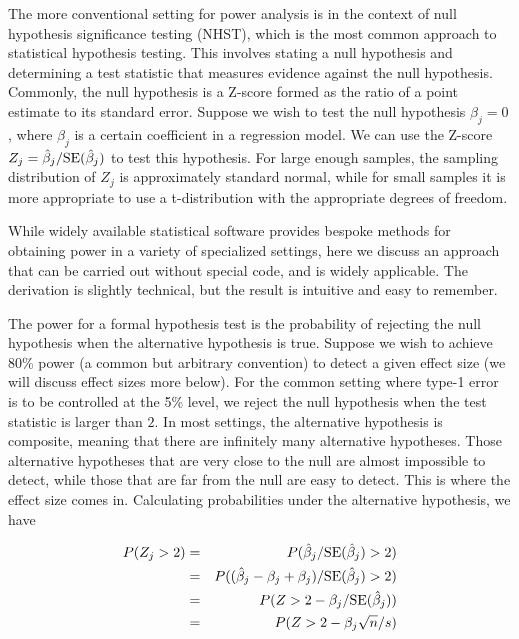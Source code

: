 The more conventional setting for power analysis is in the context of null hypothesis significance testing (NHST), which is the most common approach to statistical hypothesis testing.  This involves stating a null hypothesis and determining a test statistic that measures evidence against the null hypothesis. Commonly, the null hypothesis is a Z-score formed as the ratio of a point estimate to its standard error.  Suppose we wish to test the null hypothesis $\beta_j = 0$, where $\beta_j$ is a certain coefficient in a regression model. We can use the Z-score $Z_j = \hat{\beta}_j / {\rm SE}(\hat{\beta}_j)$ to test this hypothesis.  For large enough samples, the sampling distribution of $Z_j$ is approximately standard normal, while for small samples it is more appropriate to use a t-distribution with the appropriate degrees of freedom.

While widely available statistical software provides bespoke methods for obtaining power in a variety of specialized settings, here we discuss an approach that can be carried out without special code, and is widely applicable.  The derivation is slightly technical, but the result is intuitive and easy to remember.

The power for a formal hypothesis test is the probability of rejecting the null hypothesis when the alternative hypothesis is true.  Suppose we wish to achieve 80\% power (a common but arbitrary convention) to detect a given effect size (we will discuss effect sizes more below).  For the common setting where type-1 error is to be controlled at the 5\% level, we reject the null hypothesis when the test statistic is larger than $2$.  In most settings, the alternative hypothesis is composite, meaning that there are infinitely many alternative hypotheses.  Those alternative hypotheses that are very close to the null are almost impossible to detect, while those that are far from the null are easy to detect.  This is where the effect size comes in. Calculating probabilities under the alternative hypothesis, we have

\begin{eqnarray*}
P(Z_j > 2) &=& P(\hat{\beta}_j / {\rm SE}(\hat{\beta}_j) > 2)\\
&=& P((\hat{\beta}_j - \beta_j + \beta_j) / {\rm SE}(\hat{\beta}_j) > 2)\\
&=& P(Z > 2 - \beta_j / {\rm SE}(\hat{\beta}_j))\\
&=& P(Z > 2 - \beta_j \sqrt{n} / s)\\
\end{eqnarray*}

